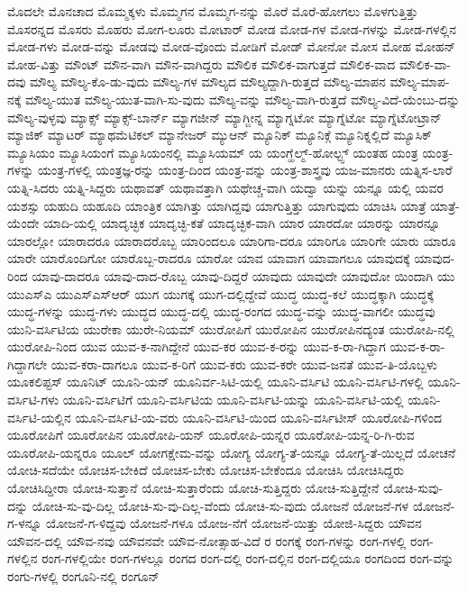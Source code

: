 {ಮೊದಲೇ
ಮೊನಚಾದ
ಮೊಮ್ಮಕ್ಕಳು
ಮೊಮ್ಮಗನ
ಮೊಮ್ಮಗ-ನನ್ನು
ಮೊರೆ
ಮೊರೆ-ಹೋಗಲು
ಮೊಳಗುತ್ತಿತ್ತು
ಮೊಸರನ್ನದ
ಮೊಸರು
ಮೊಹರು
ಮೋಗ-ಲೂರು
ಮೋಟಾರ್
ಮೋಡ
ಮೋಡ-ಗಳ
ಮೋಡ-ಗಳನ್ನು
ಮೋಡ-ಗಳಲ್ಲಿನ
ಮೋಡ-ಗಳು
ಮೋಡ-ವನ್ನು
ಮೋಡವು
ಮೋಡ-ವೊಂದು
ಮೋಡಿಗೆ
ಮೋಡ್
ಮೋನೋ
ಮೋಸ
ಮೋಹ
ಮೋಹನ್
ಮೋಹ-ವಿತ್ತು
ಮೌಂಟ್
ಮೌನ-ವಾಗಿ
ಮೌನ-ವಾಗಿದ್ದರು
ಮೌಲಿಕ
ಮೌಲಿಕ-ವಾಗುತ್ತದೆ
ಮೌಲಿಕ-ವಾದ
ಮೌಲಿಕ-ವಾ-ದವು
ಮೌಲ್ಯ
ಮೌಲ್ಯ-ಕೊ-ಡು-ವುದು
ಮೌಲ್ಯ-ಗಳ
ಮೌಲ್ಯದ
ಮೌಲ್ಯದ್ದಾಗಿ-ರುತ್ತದೆ
ಮೌಲ್ಯ-ಮಾಪನ
ಮೌಲ್ಯ-ಮಾಪ-ನಕ್ಕೆ
ಮೌಲ್ಯ-ಯುತ
ಮೌಲ್ಯ-ಯುತ-ವಾಗಿ-ಸು-ವುದು
ಮೌಲ್ಯ-ವನ್ನು
ಮೌಲ್ಯ-ವಾಗಿ-ರುತ್ತದೆ
ಮೌಲ್ಯ-ವಿದೆ-ಯೆಂಬು-ದನ್ನು
ಮೌಲ್ಯ-ವುಳ್ಳವು
ಮ್ಯಾಕ್ಸ್
ಮ್ಯಾಕ್ಸ್-ಬಾರ್ನ್
ಮ್ಯಾಗಜೀನ್
ಮ್ಯಾಗ್ಜೀನ್ನ
ಮ್ಯಾಗ್ನಟೋ
ಮ್ಯಾಗ್ನೆಟೋ
ಮ್ಯಾಗ್ನೆಟೋಟ್ರಾನ್
ಮ್ಯಾಜಿಕ್
ಮ್ಯಾಟರ್
ಮ್ಯಾಥಮೆಟಿಕಲ್
ಮ್ಯಾನೇಜರ್
ಮ್ಯುಆನ್
ಮ್ಯೂನಿಕ್
ಮ್ಯೂನಿಕ್ಗೆ
ಮ್ಯೂನಿಕ್ನಲ್ಲಿದೆ
ಮ್ಯೂಸಿಕ್
ಮ್ಯೂಸಿಯಂ
ಮ್ಯೂಸಿಯಂಗೆ
ಮ್ಯೂಸಿಯಂನಲ್ಲಿ
ಮ್ಯೂಸಿಯಮ್
ಯ
ಯಂಗ್ಹೆಲ್ಮ್-ಹೋಲ್ಟ್ಸ್
ಯಂತಹ
ಯಂತ್ರ
ಯಂತ್ರ-ಗಳನ್ನು
ಯಂತ್ರ-ಗಳಲ್ಲಿ
ಯಂತ್ರಜ್ಞ-ರನ್ನು
ಯಂತ್ರ-ದಿಂದ
ಯಂತ್ರ-ವನ್ನು
ಯಂತ್ರ-ಶಾಸ್ತ್ರವು
ಯಜ-ಮಾನರು
ಯತ್ನಿಸ-ಲಾರೆ
ಯತ್ನಿ-ಸಿದರು
ಯತ್ನಿ-ಸಿದ್ದರು
ಯಥಾವತ್
ಯಥಾವತ್ತಾಗಿ
ಯಥೇಚ್ಚ-ವಾಗಿ
ಯದ್ವಾ
ಯನ್ನು
ಯನ್ನೂ
ಯಲ್ಲಿ
ಯವರ
ಯಶಸ್ಸು
ಯಹುದಿ
ಯಹೂದಿ
ಯಾಂತ್ರಿಕ
ಯಾಗಿತ್ತು
ಯಾಗಿದ್ದವು
ಯಾಗುತ್ತಿತ್ತು
ಯಾಗುವುದು
ಯಾಚಿಸಿ
ಯಾತ್ರೆ
ಯಾತ್ರೆ-ಯೆಂದೇ
ಯಾದಿ-ಯಲ್ಲಿ
ಯಾದೃಚ್ಛಿಕ
ಯಾದೃಚ್ಛಿ-ಕತೆ
ಯಾದೃಚ್ಛಿಕ-ವಾಗಿ
ಯಾರ
ಯಾರದೋ
ಯಾರನ್ನು
ಯಾರನ್ನೂ
ಯಾರಲ್ಲೋ
ಯಾರಾದರೂ
ಯಾರಾದರೊಬ್ಬ
ಯಾರಿಂದಲೂ
ಯಾರಿಗಾ-ದರೂ
ಯಾರಿಗೂ
ಯಾರಿಗೇ
ಯಾರು
ಯಾರೂ
ಯಾರೇ
ಯಾರೊಂದಿಗೋ
ಯಾರೊಬ್ಬ-ರಾದರೂ
ಯಾರೋ
ಯಾವ
ಯಾವಾಗ
ಯಾವಾಗಲೂ
ಯಾವುದಕ್ಕೆ
ಯಾವುದ-ರಿಂದ
ಯಾವು-ದಾದರೂ
ಯಾವು-ದಾದ-ರೊಬ್ಬ
ಯಾವು-ದಿದ್ದರೆ
ಯಾವುದು
ಯಾವುದೇ
ಯಾವುದೋ
ಯಿಂದಾಗಿ
ಯು
ಯುಎಸ್ಎ
ಯುಎಸ್ಎಸ್ಆರ್
ಯುಗ
ಯುಗಕ್ಕೆ
ಯುಗ-ದಲ್ಲಿದ್ದೇವೆ
ಯುದ್ಧ
ಯುದ್ಧ-ಕಲೆ
ಯುದ್ಧಕ್ಕಾಗಿ
ಯುದ್ಧಕ್ಕೆ
ಯುದ್ಧ-ಗಳನ್ನು
ಯುದ್ಧ-ಗಳು
ಯುದ್ಧದ
ಯುದ್ಧ-ದಲ್ಲಿ
ಯುದ್ಧ-ರಂಗದ
ಯುದ್ಧ-ವನ್ನು
ಯುದ್ಧ-ವಾಗಲೀ
ಯುದ್ಧವು
ಯುನಿ-ವರ್ಸಿಟಿಯ
ಯುರೇಕಾ
ಯುರೇ-ನಿಯಮ್
ಯುರೋಪಿಗೆ
ಯುರೋಪಿನ
ಯುರೋಪಿನದ್ಯಂತ
ಯುರೋಪಿ-ನಲ್ಲಿ
ಯುರೋಪಿ-ನಿಂದ
ಯುವ
ಯುವ-ಕ-ನಾಗಿದ್ದೇನೆ
ಯುವ-ಕರ
ಯುವ-ಕ-ರನ್ನು
ಯುವ-ಕ-ರಾ-ಗಿದ್ದಾಗ
ಯುವ-ಕ-ರಾ-ಗಿದ್ದಾಗಲೇ
ಯುವ-ಕರಾ-ದಾಗಲೂ
ಯುವ-ಕ-ರಿಗೆ
ಯುವ-ಕರು
ಯುವ-ಕರೇ
ಯುವ-ಜನತೆ
ಯುವ-ತಿ-ಯೊಬ್ಬಳು
ಯೂಕಲಿಪ್ಟಸ್
ಯೂನಿಟ್
ಯೂನಿ-ಯನ್
ಯೂನಿರ್ವ-ಸಿಟಿ-ಯಲ್ಲಿ
ಯೂನಿ-ವರ್ಸಿಟಿ
ಯೂನಿ-ವರ್ಸಿಟಿ-ಗಳಲ್ಲಿ
ಯೂನಿ-ವರ್ಸಿಟಿ-ಗಳು
ಯೂನಿ-ವರ್ಸಿಟಿಗೆ
ಯೂನಿ-ವರ್ಸಿಟಿಯ
ಯೂನಿ-ವರ್ಸಿಟಿ-ಯನ್ನು
ಯೂನಿ-ವರ್ಸಿಟಿ-ಯಲ್ಲಿ
ಯೂನಿ-ವರ್ಸಿಟಿ-ಯಲ್ಲಿನ
ಯೂನಿ-ವರ್ಸಿಟಿ-ಯ-ವರು
ಯೂನಿ-ವರ್ಸಿಟಿ-ಯಿಂದ
ಯೂನಿ-ವರ್ಸಿಟೀಸ್
ಯೂರೋಪಿ-ಗಳಿಂದ
ಯೂರೋಪಿಗೆ
ಯೂರೋಪಿನ
ಯೂರೋಪಿ-ಯನ್
ಯೂರೋಪಿ-ಯನ್ನರ
ಯೂರೋಪಿ-ಯನ್ನ-ರಿ-ಗಿ-ರುವ
ಯೂರೋಪಿ-ಯನ್ನರೂ
ಯೂಲ್
ಯೋಗಕ್ಷೇಮ-ವನ್ನು
ಯೋಗ್ಯ
ಯೋಗ್ಯ-ತೆ-ಯನ್ನೂ
ಯೋಗ್ಯ-ತೆ-ಯಿಲ್ಲದೆ
ಯೋಚನೆ
ಯೋಚಿ-ಸದೆಯೇ
ಯೋಚಿಸ-ಬೇಕಿದೆ
ಯೋಚಿಸ-ಬೇಕು
ಯೋಚಿಸ-ಬೇಕೆಂದೂ
ಯೋಚಿಸಿ
ಯೋಚಿಸಿದ್ದರು
ಯೋಚಿಸಿದ್ದೀರಾ
ಯೋಚಿ-ಸುತ್ತಾನೆ
ಯೋಚಿ-ಸುತ್ತಾರೆಂದು
ಯೋಚಿ-ಸುತ್ತಿದ್ದರು
ಯೋಚಿ-ಸುತ್ತಿದ್ದೇನೆ
ಯೋಚಿ-ಸುವು-ದನ್ನು
ಯೋಚಿ-ಸು-ವು-ದಿಲ್ಲ
ಯೋಚಿ-ಸು-ವು-ದಿಲ್ಲ-ವೆಂದು
ಯೋಚಿ-ಸು-ವುದು
ಯೋಜನೆ
ಯೋಜನೆ-ಗಳ
ಯೋಜನೆ-ಗ-ಳನ್ನೂ
ಯೋಜನೆ-ಗ-ಳಿದ್ದವು
ಯೋಜನೆ-ಗಳೂ
ಯೋಜ-ನೆಗೆ
ಯೋಜನೆ-ಯಿತ್ತು
ಯೋಜಿ-ಸಿದ್ದರು
ಯೌವನ
ಯೌವನ-ದಲ್ಲಿ
ಯೌವ-ನವು
ಯೌವನವೇ
ಯೌವ-ನೋತ್ಸಾಹ-ವಿದೆ
ರ
ರಂಗಕ್ಕೆ
ರಂಗ-ಗಳನ್ನು
ರಂಗ-ಗಳಲ್ಲಿ
ರಂಗ-ಗಳಲ್ಲಿನ
ರಂಗ-ಗಳಲ್ಲಿಯೇ
ರಂಗ-ಗಳಲ್ಲೂ
ರಂಗದ
ರಂಗ-ದಲ್ಲಿ
ರಂಗ-ದಲ್ಲಿನ
ರಂಗ-ದಲ್ಲಿಯೂ
ರಂಗದಿಂದ
ರಂಗ-ವನ್ನು
ರಂಗು-ಗಳಲ್ಲಿ
ರಂಗೂನಿ-ನಲ್ಲಿ
ರಂಗೂನ್
}
